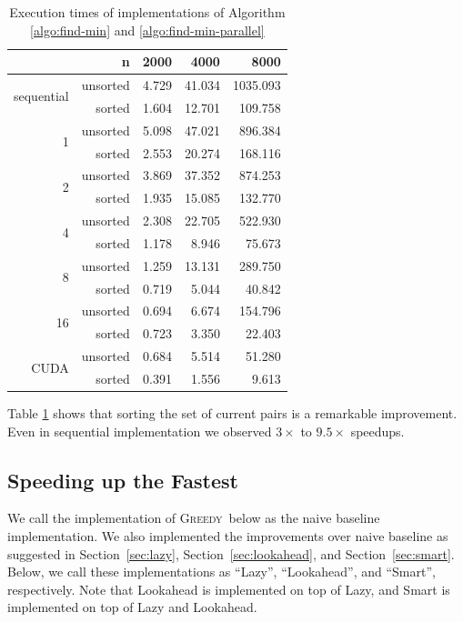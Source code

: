 \documentclass[12pt]{article}
\newcommand{\greedyAlgo}{\textsc{Greedy}}
\begin{document}
\begin{table}[ht]
	\center
	\begin{tabular}{rr|rrr}
		& n & 2000 & 4000 & 8000\\\hline
		\multirow{2}{*}{sequential} & unsorted & 4.729 & 41.034 & 1035.093\\
		& sorted & 1.604 & 12.701 & 109.758\\\hline
		\multirow{2}{*}{1} & unsorted & 5.098 & 47.021 & 896.384\\
		& sorted & 2.553 & 20.274 & 168.116\\\hline
		\multirow{2}{*}{2} & unsorted & 3.869 & 37.352 & 874.253\\
		& sorted & 1.935 & 15.085 & 132.770\\\hline
		\multirow{2}{*}{4} & unsorted & 2.308 & 22.705 & 522.930\\
		& sorted & 1.178 & 8.946 & 75.673\\\hline
		\multirow{2}{*}{8} & unsorted & 1.259 & 13.131 & 289.750\\
		& sorted & 0.719 & 5.044 & 40.842\\\hline
		\multirow{2}{*}{16} & unsorted & 0.694 & 6.674 & 154.796\\
		& sorted & 0.723 & 3.350 & 22.403\\\hline
		\multirow{2}{*}{CUDA} & unsorted & 0.684 & 5.514 & 51.280\\
		& sorted & 0.391 & 1.556 & 9.613
	\end{tabular}
	\caption{Execution times of implementations of Algorithm \ref{algo:find-min} and \ref{algo:find-min-parallel}}
	\label{table:phase-2-time}
\end{table}

Table \ref{table:phase-2-time} shows that sorting the set of current pairs is a remarkable improvement. Even in sequential implementation we observed $3\times$ to $9.5\times$ speedups.

\subsection{Speeding up the Fastest}

We call the implementation of \greedyAlgo\ below as the naive baseline implementation. We also implemented the improvements over naive baseline as suggested in Section~\ref{sec:lazy}, Section~\ref{sec:lookahead}, and Section~\ref{sec:smart}. Below, we call these implementations as ``Lazy'', ``Lookahead'', and ``Smart'', respectively. Note that Lookahead is implemented on top of Lazy, and Smart is implemented on top of Lazy and Lookahead.
\end{document}
